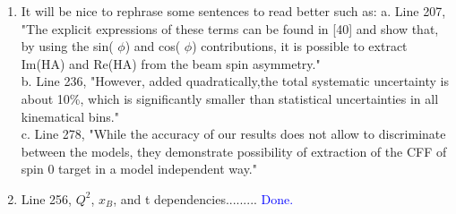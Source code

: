 \documentclass[a4paper,11pt,twoside]{article}
\begin{document}
\begin{enumerate}
\item It will be nice to rephrase some sentences to read better such as:
    a. Line 207, "The explicit expressions of these terms can be found in [40] 
    and show that, by using the sin( $\phi$) and cos( $\phi$) contributions, it 
    is possible to extract Im(HA) and Re(HA) from the beam spin asymmetry."\\
    
    b.  Line 236, "However, added quadratically,the total systematic 
    uncertainty is about 10\%, which is significantly smaller than statistical 
    uncertainties in all kinematical bins."\\
    
    c. Line 278, "While the accuracy of our results does not allow to 
    discriminate between the models, they demonstrate possibility of extraction 
    of the CFF of spin 0 target in a model independent way."\\
    \textcolor{blue}{ }
  
\item Line 256, $Q^2$, $x_B$, and t dependencies.........
\textcolor{blue}{Done. }
  
\end{enumerate}
\end{document}
